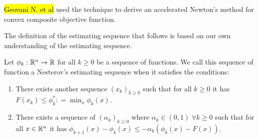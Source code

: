 \documentclass[12pt]{article}
\begin{document}
        {\hl{Geovani N. et al}} \cite{grapiglia_accelerated_2019}
        used the technique to derive an accelerated Newton's method for convex composite objective function. 
        \par
        The definition of the estimating sequence that follows is based on our own understanding of the estimating sequence. 
        \begin{definition}\label{def:nes-est-seq}
            Let $\phi_k : \mathbb R^n \rightarrow\mathbb R$ for all $k \ge 0$ be a sequence of functions. 
            We call this sequence of function a Nesterov's estimating sequence when it satisfies the conditions: 
            \begin{enumerate}
                \item There exists another sequence $(x_k)_{k \ge 0}$ such that for all $k \ge 0$ it has $F(x_k) \le \phi_k^*: =\min_{x}\phi_k(x)$. 
                \item There exists a sequence of $(\alpha_k)_{k \ge 0}$ where $\alpha_k \in (0, 1)\; \forall k \ge0 $ such that for all $x \in \mathbb R^n$ it has $\phi_{k + 1}(x) - \phi_k(x) \le - \alpha_k(\phi_k(x) - F(x))$. 
            \end{enumerate}
        \end{definition}
\end{document}
